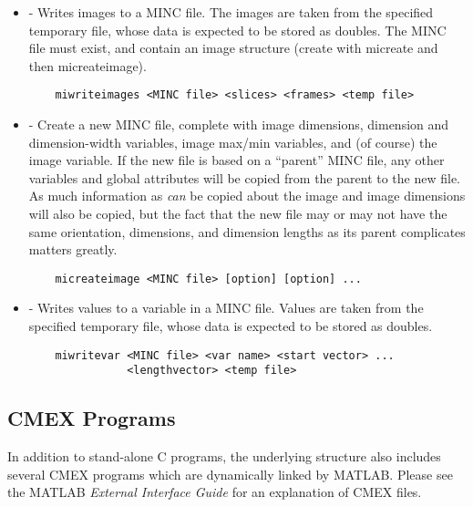 \begin {itemize}

\item {} - Writes images to a MINC file.  The
images are taken from the specified temporary file, whose data is
expected to be stored as doubles.  The MINC file must exist, and
contain an image structure (create with micreate and then
micreateimage).
\begin{verbatim}
    miwriteimages <MINC file> <slices> <frames> <temp file>
\end{verbatim}

\item {} - Create a new MINC file, complete with
image dimensions, dimension and dimension-width variables, image
max/min variables, and (of course) the image variable.  If the new
file is based on a ``parent'' MINC file, any other variables and
global attributes will be copied from the parent to the new file.  As
much information as {\em can} be copied about the image and image
dimensions will also be copied, but the fact that the new file may or
may not have the same orientation, dimensions, and dimension lengths
as its parent complicates matters greatly.
\begin{verbatim}
    micreateimage <MINC file> [option] [option] ...
\end{verbatim}

\item {} - Writes values to a variable in a MINC file.  
Values are taken from the specified temporary file, whose data is
expected to be stored as doubles.
\begin{verbatim}
    miwritevar <MINC file> <var name> <start vector> ...
               <lengthvector> <temp file>
\end{verbatim}

\end{itemize}


\subsection{CMEX Programs}

In addition to stand-alone C programs, the underlying structure also includes
several CMEX programs which are dynamically linked by MATLAB.  Please see the
MATLAB {\em External Interface Guide} for an explanation of CMEX files.

